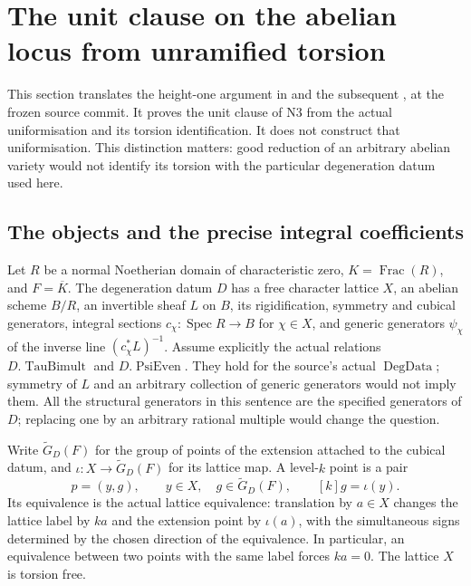\section{The unit clause on the abelian locus from unramified torsion}
\label{sec:psi-unit-source}
This section translates the height-one argument in
 and the subsequent
, at the frozen source commit.
It proves the unit clause of N3 from the actual uniformisation and its
torsion identification.  It does not construct that uniformisation.
This distinction matters: good reduction of an arbitrary abelian variety
would not identify its torsion with the particular degeneration datum
used here.

\subsection{The objects and the precise integral coefficients}
Let \(R\) be a normal Noetherian domain of characteristic zero,
\(K=\operatorname{Frac}(R)\), and \(F=\overline K\).
The degeneration datum \(D\) has a free character lattice \(X\), an
abelian scheme \(B/R\), an invertible sheaf \(L\) on \(B\), its
rigidification, symmetry and cubical generators, integral sections
\(c_\chi:\operatorname{Spec}R\to B\) for \(\chi\in X\), and generic
generators \(\psi_\chi\) of the inverse line \((c_\chi^*L)^{-1}\).
Assume explicitly the actual relations \(D.\operatorname{TauBimult}\)
and \(D.\operatorname{PsiEven}\). They hold for the source's actual
\(\operatorname{DegData}\); symmetry of \(L\) and an arbitrary
collection of generic generators would not imply them.
All the structural generators in this sentence are the specified
generators of \(D\); replacing one by an arbitrary rational multiple
would change the question.

Write \(\widetilde G_D(F)\) for the group of points of the extension
attached to the cubical datum, and \(\iota:X\to\widetilde G_D(F)\) for
its lattice map.  A level-\(k\) point is a pair
\[
          p=(y,g),\qquad y\in X,\quad g\in\widetilde G_D(F),
          \qquad [k]g=\iota(y).
\]
Its equivalence is the actual lattice equivalence:
translation by \(a\in X\) changes the lattice label by \(ka\) and the
extension point by \(\iota(a)\), with the simultaneous signs determined
by the chosen direction of the equivalence.  In particular, an
equivalence between two points with the same label forces \(ka=0\).
The lattice \(X\) is torsion free.

